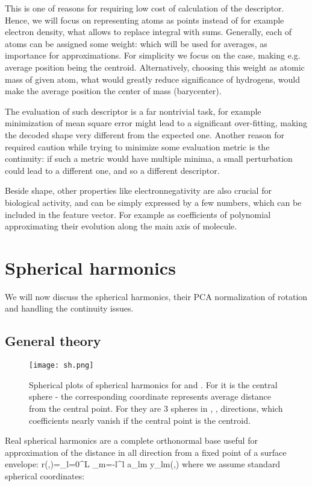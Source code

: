 \documentclass[10pt,journal]{IEEEtranTCOM}
\theoremstyle{plain}
\begin{document}
This is one of reasons for requiring low cost of calculation of the descriptor. Hence, we will focus on representing atoms as points instead of for example electron density, what allows to replace integral with sums. Generally, each of  atoms can be assigned some weight:  which will be used for averages, as importance for approximations. For simplicity we focus on the  case, making e.g. average position being the centroid. Alternatively, choosing this weight as atomic mass of given atom, what would greatly reduce significance of hydrogens, would make the average position the center of mass (barycenter).

The evaluation of such descriptor is a far nontrivial task, for example minimization of mean square error might lead to a significant over-fitting, making the decoded shape very different from the expected one. Another reason for required caution while trying to minimize some evaluation metric is the continuity: if such a metric would have multiple minima, a small perturbation could lead to a different one, and so a different descriptor.

Beside shape, other properties like electronnegativity are also crucial for biological activity, and can be simply expressed by a few numbers, which can be included in the feature vector. For example as coefficients of polynomial approximating their evolution along the main axis of molecule.

\section{Spherical harmonics}
We will now discuss the spherical harmonics, their PCA normalization of rotation and handling the continuity issues.
\subsection{General theory}
\begin{figure}[t!]
    \centering
        \texttt{[image: sh.png]}
        \caption{Spherical plots of spherical harmonics for  and . For  it is the central sphere - the corresponding coordinate represents average distance from the central point. For  they are 3 spheres in , ,  directions, which coefficients nearly vanish if the central point is the centroid. }
        \label{sh}
\end{figure}


Real spherical harmonics are a complete orthonormal base useful for approximation of the distance in all direction from a fixed point of a surface envelope:
\be r(\theta,\varphi)=\sum_{l=0}^L \sum_{m=-l}^l a_{lm} y_{lm}(\theta,\varphi) \label{sheq}\ee
where we assume standard spherical coordinates:
\end{document}
